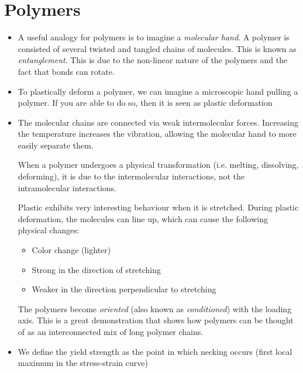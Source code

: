 \section{Polymers}
\begin{itemize}
    \item A useful analogy for polymers is to imagine a \textit{molecular hand}. A polymer is consisted of several twisted and tangled chains of molecules. This is known as \textit{entanglement}. This is due to the non-linear nature of the polymers and the fact that bonds can rotate.
    \item To plastically deform a polymer, we can imagine a microscopic hand pulling a polymer. If you are able to do so, then it is seen as plastic deformation
    \item The molecular chains are connected via weak intermolecular forces. Increasing the temperature increases the vibration, allowing the molecular hand to more easily separate them.
    \begin{idea}
        When a polymer undergoes a physical transformation (i.e. melting, dissolving, deforming), it is due to the intermolecular interactions, not the intramolecular interactions. 
    \end{idea}
    \begin{case}
        Plastic exhibits very interesting behaviour when it is stretched. During plastic deformation, the molecules can line up, which can cause the following physical changes:
        \begin{itemize}
            \item Color change (lighter)
            \item Strong in the direction of stretching
            \item Weaker in the direction perpendicular to stretching
        \end{itemize}
        The polymers become \textit{oriented} (also known as \textit{conditioned}) with the loading axis. This is a great demonstration that shows how polymers can be thought of as an interconnected mix of long polymer chains.
    \end{case}
    \item We define the yield strength as the point in which necking occurs (first local maximum in the stress-strain curve)

\end{itemize}

